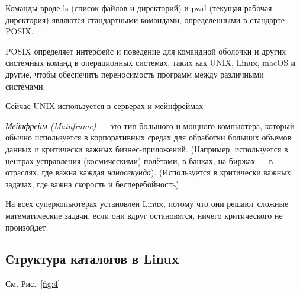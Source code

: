 \documentclass[oneside, final, 14pt]{extreport} %
\begin{document}
Команды вроде ls (список файлов и директорий) и pwd (текущая рабочая директория) являются стандартными командами, определенными в стандарте POSIX.

POSIX определяет интерфейс и поведение для командной оболочки и других системных команд в операционных системах, таких как UNIX, Linux, macOS и другие, чтобы обеспечить переносимость программ между различными системами.

Сейчас UNIX используется в серверах и мейнфреймах

\textit{Мейнфрейм (Mainframe)} --- это тип большого и мощного компьютера, который обычно используется в корпоративных средах для обработки больших объемов данных и критически важных бизнес-приложений.
(Например, используется в центрах усправления (космическими) полётами, в банках, на биржах --- в отраслях, где
важна каждая \textit{наносекунда}). (Используется в критически важных задачах, где
важна скорость и бесперебойность)

На всех суперкопьютерах установлен Linux, потому что они решают сложные математические
задачи, если они вдруг остановятся, ничего критического не произойдёт.






\subsection{Структура каталогов в Linux}

См. Рис.~\ref{fig:4}
\end{document}

